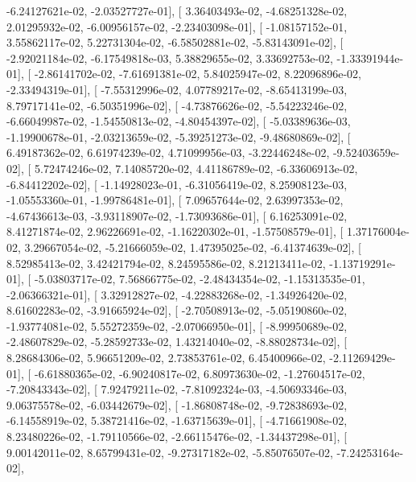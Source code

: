 \documentclass{article}
\begin{document}
         -6.24127621e-02,  -2.03527727e-01],
       [  3.36403493e-02,  -4.68251328e-02,   2.01295932e-02,
         -6.00956157e-02,  -2.23403098e-01],
       [ -1.08157152e-01,   3.55862117e-02,   5.22731304e-02,
         -6.58502881e-02,  -5.83143091e-02],
       [ -2.92021184e-02,  -6.17549818e-03,   5.38829655e-02,
          3.33692753e-02,  -1.33391944e-01],
       [ -2.86141702e-02,  -7.61691381e-02,   5.84025947e-02,
          8.22096896e-02,  -2.33494319e-01],
       [ -7.55312996e-02,   4.07789217e-02,  -8.65413199e-03,
          8.79717141e-02,  -6.50351996e-02],
       [ -4.73876626e-02,  -5.54223246e-02,  -6.66049987e-02,
         -1.54550813e-02,  -4.80454397e-02],
       [ -5.03389636e-03,  -1.19900678e-01,  -2.03213659e-02,
         -5.39251273e-02,  -9.48680869e-02],
       [  6.49187362e-02,   6.61974239e-02,   4.71099956e-03,
         -3.22446248e-02,  -9.52403659e-02],
       [  5.72474246e-02,   7.14085720e-02,   4.41186789e-02,
         -6.33606913e-02,  -6.84412202e-02],
       [ -1.14928023e-01,  -6.31056419e-02,   8.25908123e-03,
         -1.05553360e-01,  -1.99786481e-01],
       [  7.09657644e-02,   2.63997353e-02,  -4.67436613e-03,
         -3.93118907e-02,  -1.73093686e-01],
       [  6.16253091e-02,   8.41271874e-02,   2.96226691e-02,
         -1.16220302e-01,  -1.57508579e-01],
       [  1.37176004e-02,   3.29667054e-02,  -5.21666059e-02,
          1.47395025e-02,  -6.41374639e-02],
       [  8.52985413e-02,   3.42421794e-02,   8.24595586e-02,
          8.21213411e-02,  -1.13719291e-01],
       [ -5.03803717e-02,   7.56866775e-02,  -2.48434354e-02,
         -1.15313535e-01,  -2.06366321e-01],
       [  3.32912827e-02,  -4.22883268e-02,  -1.34926420e-02,
          8.61602283e-02,  -3.91665924e-02],
       [ -2.70508913e-02,  -5.05190860e-02,  -1.93774081e-02,
          5.55272359e-02,  -2.07066950e-01],
       [ -8.99950689e-02,  -2.48607829e-02,  -5.28592733e-02,
          1.43214040e-02,  -8.88028734e-02],
       [  8.28684306e-02,   5.96651209e-02,   2.73853761e-02,
          6.45400966e-02,  -2.11269429e-01],
       [ -6.61880365e-02,  -6.90240817e-02,   6.80973630e-02,
         -1.27604517e-02,  -7.20843343e-02],
       [  7.92479211e-02,  -7.81092324e-03,  -4.50693346e-03,
          9.06375578e-02,  -6.03442679e-02],
       [ -1.86808748e-02,  -9.72838693e-02,  -6.14558919e-02,
          5.38721416e-02,  -1.63715639e-01],
       [ -4.71661908e-02,   8.23480226e-02,  -1.79110566e-02,
         -2.66115476e-02,  -1.34437298e-01],
       [  9.00142011e-02,   8.65799431e-02,  -9.27317182e-02,
         -5.85076507e-02,  -7.24253164e-02],
\end{document}
